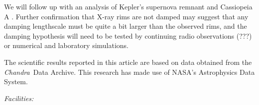 \documentclass[iop, apj, numberedappendix, twocolappendix]{emulateapj}
\newcommand*{\Chandra}{\textit{Chandra}\ }
\begin{document}
We will follow up with an analysis of Kepler's supernova remnant and
Cassiopeia A \citep[see][]{araya2010}.  Further confirmation that X-ray rims
are not damped may suggest that any damping lengthscale must be quite a bit
larger than the observed rims, and the damping hypothesis will need to be
tested by continuing radio observations (???) or numerical and laboratory
simulations.

\acknowledgments

The scientific results reported in this article are based on data obtained from
the \Chandra Data Archive.
This research has made use of NASA's Astrophysics Data System.

{\it Facilities:} 

\clearpage
\end{document}
